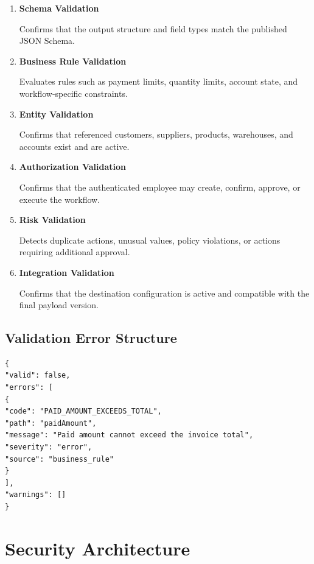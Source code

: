 \documentclass[11pt,a4paper]{article}
\begin{document}
\begin{enumerate}
\item \textbf{Schema Validation}

Confirms that the output structure and field types match the published
JSON Schema.

\item \textbf{Business Rule Validation}

Evaluates rules such as payment limits, quantity limits, account state,
and workflow-specific constraints.

\item \textbf{Entity Validation}

Confirms that referenced customers, suppliers, products, warehouses,
and accounts exist and are active.

\item \textbf{Authorization Validation}

Confirms that the authenticated employee may create, confirm, approve,
or execute the workflow.

\item \textbf{Risk Validation}

Detects duplicate actions, unusual values, policy violations, or actions
requiring additional approval.

\item \textbf{Integration Validation}

Confirms that the destination configuration is active and compatible
with the final payload version.
\end{enumerate}

\subsection{Validation Error Structure}

\begin{lstlisting}[language={},caption={Structured validation error}]
{
"valid": false,
"errors": [
{
"code": "PAID_AMOUNT_EXCEEDS_TOTAL",
"path": "paidAmount",
"message": "Paid amount cannot exceed the invoice total",
"severity": "error",
"source": "business_rule"
}
],
"warnings": []
}
\end{lstlisting}

\section{Security Architecture}
\end{document}
